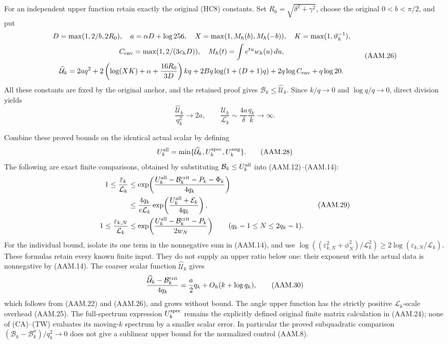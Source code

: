 For an independent upper function retain exactly the original (HC8)
constants. Set $R_0=\sqrt{\delta^2+\gamma^2}$, choose the original
$0<b<\pi/2$, and put
\[
 \begin{gathered}
 D=\max(1,2/b,2R_0),\quad a=\alpha D+\log256,\quad
 X=\max(1,M_h(b),M_h(-b)),\quad
 K=\max(1,\vartheta_h^{-1}),\\
 C_{\rm env}=\max(1,2/(3c_hD)),\quad
 M_h(t)=\int e^{tu}w_h(u)\,du,\\
 \widehat{\mathcal U}_k=2a q^2+
 2\left(\log(XK)+\alpha+\frac{16R_0}{3D}\right)kq
 +2Bq\log(1+(D+1)q)+2q\log C_{\rm env}+q\log20.
 \end{gathered}
 \tag{AAM.26}
\]
All these constants are fixed by the original anchor, and the retained
proof gives $\mathcal B_k\leq\widehat{\mathcal U}_k$.
Since $k/q\to0$ and $\log q/q\to0$, direct division yields
\[
 \frac{\widehat{\mathcal U}_k}{q_k^2}\longrightarrow2a,
 \qquad
 \frac{\widehat{\mathcal U}_k}{\mathcal L_k}
          \sim\frac{4a}{\delta}\frac{q_k}{k}\longrightarrow\infty.
 \tag{AAM.27}
\]

Combine these proved bounds on the identical actual scalar by defining
\[
 U_k^{\rm all}=\min\{\widehat{\mathcal U}_k,
                                  U_k^{\rm spec},U_k^{\rm ang}\}.
 \tag{AAM.28}
\]
The following are exact finite comparisons, obtained by substituting
$\mathcal B_k\leq U_k^{\rm all}$ into (AAM.12)--(AAM.14):
\[
 \begin{aligned}
 1\leq\frac{\overline\varepsilon_k}{\mathcal L_k}
 &\leq\exp\!\left(
 \frac{U_k^{\rm all}-\mathcal B_k^{\rm crit}-P_k-\Phi_k}{4q_k}
                    \right)\\
 &\leq\frac{4q_k}{e\mathcal L_k}
       \exp\!\left(\frac{U_k^{\rm all}+\mathcal E_k}{4q_k}\right),\\
 1\leq\frac{\varepsilon_{k,N}}{\mathcal L_k}
 &\leq\exp\!\left(
 \frac{U_k^{\rm all}-\mathcal B_k^{\rm crit}-P_k}{2w_N}
                    \right)
       \qquad(q_k-1\leq N\leq2q_k-1).
 \end{aligned}
 \tag{AAM.29}
\]
For the individual bound, isolate its one term in the nonnegative sum
in (AAM.14), and use
$\log((\varepsilon_{k,N}^2+\phi_N^2)/\mathcal L_k^2)
\geq2\log(\varepsilon_{k,N}/\mathcal L_k)$.
These formulas retain every known finite input. They do not supply
an upper ratio below one: their exponent with the actual data is
nonnegative by (AAM.14). The coarser scalar function
$\widehat{\mathcal U}_k$ gives
\[
 \frac{\widehat{\mathcal U}_k-\mathcal B_k^{\rm crit}}{4q_k}
          =\frac a2q_k+O_h(k+\log q_k),
 \tag{AAM.30}
\]
which follows from (AAM.22) and (AAM.26), and grows without bound.
The angle upper function has the strictly positive
$\mathcal L_k$-scale overhead (AAM.25). The full-spectrum expression
$U_k^{\rm spec}$ remains the explicitly defined original finite
matrix calculation in (AAM.24); none of (CA)--(TW) evaluates its
moving-$k$ spectrum by a smaller scalar error. In particular the
proved subquadratic comparison
$(\mathcal B_k-\mathcal B_k^\sigma)/q_k^2\to0$ does not give a
sublinear upper bound for the normalized control (AAM.8).

